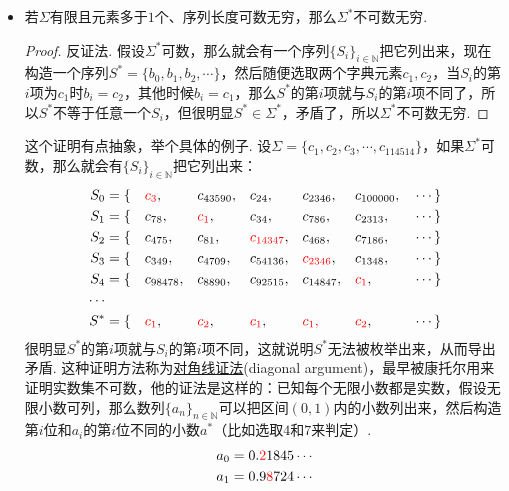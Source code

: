 \documentclass[main.tex]{subfiles}
\begin{document}
\begin{itemize}
    \item 若\(\Sigma\)有限且元素多于\(1\)个、序列长度可数无穷，那么\(\Sigma^*\)不可数无穷.
    \begin{proof}
        反证法. 假设\(\Sigma^*\)可数，那么就会有一个序列\(\{S_i\}_{i \in \mathbb{N}}\)把它列出来，现在构造一个序列\(S^*=\{b_0, b_1, b_2, \cdots\}\)，然后随便选取两个字典元素\(c_1, c_2\)，当\(S_i\)的第\(i\)项为\(c_1\)时\(b_i=c_2\)，其他时候\(b_i=c_1\)，那么\(S^*\)的第\(i\)项就与\(S_i\)的第\(i\)项不同了，所以\(S^*\)不等于任意一个\(S_i\)，但很明显\(S^* \in \Sigma^*\)，矛盾了，所以\(\Sigma^*\)不可数无穷. 
    \end{proof}
    \begin{note}
        这个证明有点抽象，举个具体的例子. 设\(\Sigma = \{c_1, c_2, c_3, \cdots, c_{114514}\}\)，如果\(\Sigma^*\)可数，那么就会有\(\{S_i\}_{i \in \mathbb{N}}\)把它列出来：
        \begin{align*}
            S_0 &= \{&&{\color{red}c_3}, &&c_{43590}, &&c_{24}, &&c_{2346}, &&c_{100000}, &&\cdots\} \\
            S_1 &= \{&&c_{78}, &&{\color{red}c_1}, &&c_{34}, &&c_{786}, &&c_{2313}, &&\cdots\} \\
            S_2 &= \{&&c_{475}, &&c_{81}, &&{\color{red}c_{14347}}, &&c_{468}, &&c_{7186}, &&\cdots\} \\
            S_3 &= \{&&c_{349}, &&c_{4709}, &&c_{54136}, &&{\color{red}c_{2346}}, &&c_{1348}, &&\cdots\} \\
            S_4 &= \{&&c_{98478}, &&c_{8890}, &&c_{92515}, &&c_{14847}, &&{\color{red}c_1}, &&\cdots\} \\
            \cdots \\
            S^* &= \{&&{\color{red}c_1}, &&{\color{red}c_2}, &&{\color{red}c_1}, &&{\color{red}c_1,} &&{\color{red}c_2}, &&\cdots\} \\
        \end{align*}
        很明显\(S^*\)的第\(i\)项就与\(S_i\)的第\(i\)项不同，这就说明\(S^*\)无法被枚举出来，从而导出矛盾. 这种证明方法称为\uline{对角线证法}(diagonal argument)，最早被康托尔用来证明实数集不可数，他的证法是这样的：已知每个无限小数都是实数，假设无限小数可列，那么数列\(\{a_n\}_{n \in \mathbb{N}}\)可以把区间\((0,1)\)内的小数列出来，然后构造第\(i\)位和\(a_i\)的第\(i\)位不同的小数\(a^*\)（比如选取\(4\)和\(7\)来判定）.
        \begin{align*}
            a_0 &= 0.{\color{red}2} 1845\cdots \\
            a_1 &= 0.9{\color{red}8} 724\cdots \\

\end{align*}
\end{note}
\end{itemize}
\end{document}
